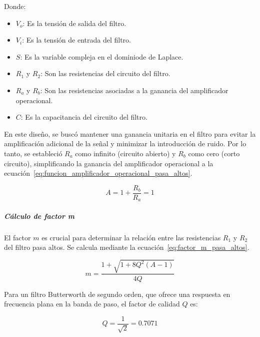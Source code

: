                     Donde:
                    \begin{itemize}
                        \item $V_o$: Es la tensión de salida del filtro.
                        \item $V_i$: Es la tensión de entrada del filtro.
                        \item $S$: Es la variable compleja en el dominiode de Laplace.
                        \item $R_1$ y $R_2$: Son las resistencias del circuito del filtro.
                        \item $R_a$ y $R_b$: Son las resistencias asociadas a la ganancia del amplificador operacional.
                        \item $C$: Es la capacitancia del circuito del filtro.
                    \end{itemize}

                    En este diseño, se buscó mantener una ganancia unitaria en el filtro para evitar la amplificación adicional de la señal y minimizar la introducción de ruido. Por lo tanto, se estableció $R_a$ como infinito (circuito abierto) y $R_b$ como cero (corto circuito), simplificando la ganancia del amplificador operacional a la ecuación~\ref{eq:funcion_amplificador_operacional_pasa_altos}.

                    \begin{equation}
                        \label{eq:funcion_amplificador_operacional_pasa_altos}
                        A = 1 + \frac{R_b}{R_a} = 1
                    \end{equation}

                \subparagraph{Cálculo de factor m}
                    El factor $m$ es crucial para determinar la relación entre las resistencias $R_1$ y $R_2$ del filtro pasa altos. Se calcula mediante la ecuación~\ref{eq:factor_m_pasa_altos}.

                    \begin{equation}
                        \label{eq:factor_m_pasa_altos}
                        m = \frac{1+\sqrt{1+8Q^2(A-1)}}{4Q}
                    \end{equation}

                    Para un filtro Butterworth de segundo orden, que ofrece una respuesta en frecuencia plana en la banda de paso, el factor de calidad $Q$ es:

                    \begin{equation}
                        \label{eq:factor_calidad}
                        Q = \frac{1}{\sqrt{2}} = 0.7071
                    \end{equation}
                
